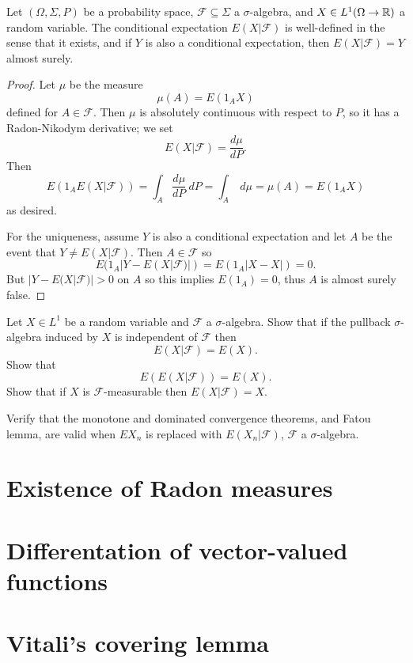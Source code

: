\begin{corollary}
Let $(\Omega, \Sigma, P)$ be a probability space, $\mathcal F \subseteq \Sigma$ a $\sigma$-algebra, and $X \in L^1(\Omega \to \mathbb{R})$ a random variable.
The conditional expectation $E(X|\mathcal F)$ is well-defined in the sense that it exists, and if $Y$ is also a conditional expectation, then $E(X|\mathcal F) = Y$ almost surely.
\end{corollary}
\begin{proof}
Let $\mu$ be the measure
\[\mu(A) = E(1_{A} X)\]
defined for $A \in \mathcal F$.
Then $\mu$ is absolutely continuous with respect to $P$, so it has a Radon-Nikodym derivative; we set
\[E(X|\mathcal F) = \frac{d\mu}{dP}.\]
Then
\[E(1_{A} E(X|\mathcal F)) = \int_{A} \frac{d\mu}{dP} ~dP = \int_{A} ~d\mu = \mu(A) = E(1_{A} X)\]
as desired.

For the uniqueness, assume $Y$ is also a conditional expectation and let $A$ be the event that $Y \neq E(X|\mathcal F)$.
Then $A \in \mathcal F$ so
\[E(1_A|Y - E(X|\mathcal F)|) = E(1_A|X - X|) = 0.\]
But $|Y - E(X|\mathcal F)| > 0$ on $A$ so this implies $E(1_A) = 0$, thus $A$ is almost surely false.
\end{proof}

\begin{exercise}
Let $X \in L^1$ be a random variable and $\mathcal F$ a $\sigma$-algebra. Show that if the pullback $\sigma$-algebra induced by $X$ is independent of $\mathcal F$ then
\[E(X|\mathcal F) = E(X).\]
Show that
\[E(E(X|\mathcal F)) = E(X).\]
Show that if $X$ is $\mathcal F$-measurable then $E(X|\mathcal F) = X$.
\end{exercise}

\begin{exercise}
Verify that the monotone and dominated convergence theorems, and Fatou lemma, are valid when $EX_{n}$ is replaced with $E(X_{n}|\mathcal F)$, $\mathcal F$ a $\sigma$-algebra.
\end{exercise}

\section{Existence of Radon measures}

\section{Differentation of vector-valued functions}

\section{Vitali's covering lemma}

